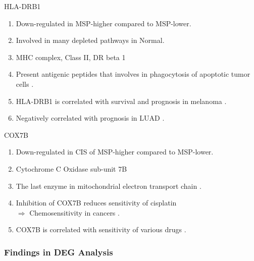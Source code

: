 \documentclass{beamer}
\begin{document}
\begin{frame}[allowframebreaks]
        \begin{block}{HLA-DRB1}
            \begin{enumerate}
                \item Down-regulated in MSP-higher compared to MSP-lower.
                \item Involved in many depleted pathways in Normal.
                \item MHC complex, Class II, DR beta 1
                \item Present antigenic peptides that involves in phagocytosis of apoptotic tumor cells \cite{HLA-DRB1-1}.
                \item HLA-DRB1 is correlated with survival and prognosis in melanoma \cite{HLA-DRB1-2}.
                \item Negatively correlated with prognosis in LUAD \cite{TNFRSF14-2}.
            \end{enumerate}
        \end{block}

        \begin{block}{COX7B}
            \begin{enumerate}
                \item Down-regulated in CIS of MSP-higher compared to MSP-lower.
                \item Cytochrome C Oxidase sub-unit 7B
                \item The last enzyme in mitochondrial electron transport chain \cite{COX7B-1}.
                \item Inhibition of COX7B reduces sensitivity of cisplatin \\
                    $\Rightarrow$ Chemosensitivity in cancers \cite{COX7B-3}.
                \item COX7B  is correlated with sensitivity of various drugs \cite{COX7B-2}.
            \end{enumerate}
        \end{block}
    \end{frame}

    \begin{frame}
        \frametitle{Findings in DEG Analysis}
    \end{frame}
\end{document}

